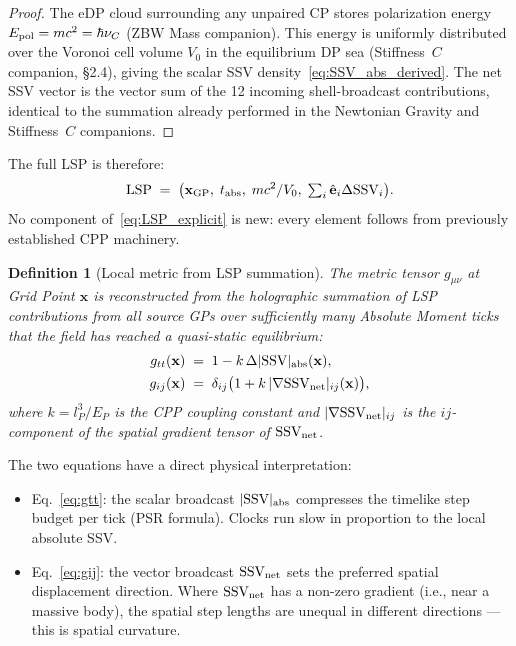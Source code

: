 \documentclass[12pt]{article}
\newtheorem{definition}[theorem]{Definition}
\newcommand{\lP}{l_P}
\newcommand{\EP}{E_P}
\newcommand{\SSV}{\text{SSV}}
\newcommand{\dibit}{\text{LSP}}
\newcommand{\gmn}{g_{\mu\nu}}
\begin{document}
\begin{proof}
The eDP cloud surrounding any unpaired CP stores polarization energy
$E_{\rm pol} = mc^2 = \hbar\nu_C$ (ZBW Mass companion).  This energy is
uniformly distributed over the Voronoi cell volume $V_0$ in the
equilibrium DP sea (Stiffness~$C$ companion, \S2.4), giving the scalar
SSV density~\eqref{eq:SSV_abs_derived}.  The net SSV vector is the
vector sum of the 12 incoming shell-broadcast contributions, identical
to the summation already performed in the Newtonian Gravity and
Stiffness~$C$ companions.
\end{proof}

The full LSP is therefore:
\begin{equation}
  \dibit \;=\; \bigl(\mathbf{x}_{\rm GP},\; t_{\rm abs},\;
  mc^2/V_0,\; \textstyle\sum_i \hat{\mathbf{e}}_i\Delta\SSV_i\bigr).
  \label{eq:LSP_explicit}
\end{equation}
No component of~\eqref{eq:LSP_explicit} is new: every element follows
from previously established CPP machinery.



\begin{definition}[Local metric from LSP summation]
The metric tensor $\gmn$ at Grid Point $\mathbf{x}$ is reconstructed
from the holographic summation of LSP contributions from all source GPs
over sufficiently many Absolute Moment ticks that the field has reached
a quasi-static equilibrium:
\begin{align}
  g_{tt}(\mathbf{x}) &\;=\; 1 - k\,\Delta|\SSV|_{\rm abs}(\mathbf{x}),
  \label{eq:gtt} \\
  g_{ij}(\mathbf{x}) &\;=\; \delta_{ij}\bigl(1 +
  k\,|\nabla\mathbf{\SSV}_{\rm net}|_{ij}(\mathbf{x})\bigr),
  \label{eq:gij}
\end{align}
where $k = \lP^3/\EP$ is the CPP coupling constant and
$|\nabla\mathbf{\SSV}_{\rm net}|_{ij}$ is the $ij$-component of the
spatial gradient tensor of $\mathbf{\SSV}_{\rm net}$.
\end{definition}

The two equations have a direct physical interpretation:

\begin{itemize}[noitemsep]
  \item Eq.~\eqref{eq:gtt}: the scalar broadcast $|\SSV|_{\rm abs}$
    compresses the timelike step budget per tick (PSR formula).  Clocks
    run slow in proportion to the local absolute SSV.
  \item Eq.~\eqref{eq:gij}: the vector broadcast $\mathbf{\SSV}_{\rm net}$
    sets the preferred spatial displacement direction.  Where
    $\mathbf{\SSV}_{\rm net}$ has a non-zero gradient (i.e., near a
    massive body), the spatial step lengths are unequal in different
    directions --- this is spatial curvature.
\end{itemize}
\end{document}
